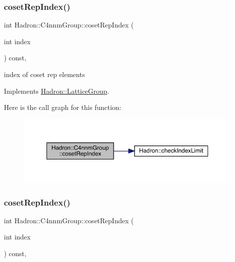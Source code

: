 \subsubsection{\texorpdfstring{cosetRepIndex()}{cosetRepIndex()}\hspace{0.1cm}{\footnotesize\ttfamily [1/2]}}
{\footnotesize\ttfamily int Hadron\+::\+C4nnm\+Group\+::coset\+Rep\+Index (\begin{DoxyParamCaption}\item[{int}]{index }\end{DoxyParamCaption}) const\hspace{0.3cm}{\ttfamily [inline]}, {\ttfamily [virtual]}}

index of coset rep elements 

Implements \mbox{\hyperlink{structHadron_1_1LatticeGroup_a7e3b9b5e2f596e6c40d64aa939a3ad6c}{Hadron\+::\+Lattice\+Group}}.

Here is the call graph for this function\+:
\nopagebreak
\begin{figure}[H]
\begin{center}
\leavevmode
\includegraphics[width=350pt]{d1/dba/structHadron_1_1C4nnmGroup_a413031d9855013b22c493696c69a2c4d_cgraph}
\end{center}
\end{figure}
\mbox{\label{structHadron_1_1C4nnmGroup_a413031d9855013b22c493696c69a2c4d}} 
\subsubsection{\texorpdfstring{cosetRepIndex()}{cosetRepIndex()}\hspace{0.1cm}{\footnotesize\ttfamily [2/2]}}
{\footnotesize\ttfamily int Hadron\+::\+C4nnm\+Group\+::coset\+Rep\+Index (\begin{DoxyParamCaption}\item[{int}]{index }\end{DoxyParamCaption}) const\hspace{0.3cm}{\ttfamily [inline]}, {\ttfamily [virtual]}}

